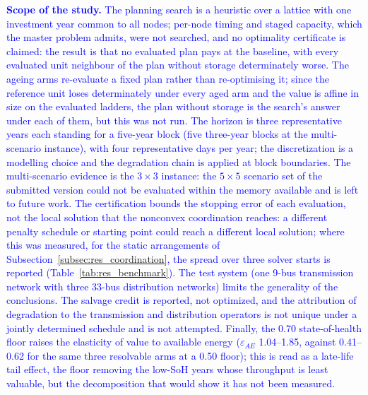 \documentclass[preprint,12pt]{elsarticle}
\begin{document}
\textcolor{blue}{
    \textbf{Scope of the study.} The planning search is a heuristic over a lattice with one investment year common to all nodes; per-node timing and staged capacity, which the master problem admits, were not searched, and no optimality certificate is claimed: the result is that no evaluated plan pays at the baseline, with every evaluated unit neighbour of the plan without storage determinately worse. The ageing arms re-evaluate a fixed plan rather than re-optimising it; since the reference unit loses determinately under every aged arm and the value is affine in size on the evaluated ladders, the plan without storage is the search's answer under each of them, but this was not run. The horizon is three representative years each standing for a five-year block (five three-year blocks at the multi-scenario instance), with four representative days per year; the discretization is a modelling choice and the degradation chain is applied at block boundaries. 
    The multi-scenario evidence is the $3 \times 3$ instance: the $5 \times 5$ scenario set of the submitted version could not be evaluated within the memory available and is left to future work. The certification bounds the stopping error of each evaluation, not the local solution that the nonconvex coordination reaches: a different penalty schedule or starting point could reach a different local solution; where this was measured, for the static arrangements of Subsection~\ref{subsec:res_coordination}, the spread over three solver starts is reported (Table~\ref{tab:res_benchmark}).
    The test system (one 9-bus transmission network with three 33-bus distribution networks) limits the generality of the conclusions. The salvage credit is reported, not optimized, and the attribution of degradation to the transmission and distribution operators is not unique under a jointly determined schedule and is not attempted. Finally, the 0.70 state-of-health floor raises the elasticity of value to available energy ($\varepsilon_{AE}$ 1.04--1.85, against 0.41--0.62 for the same three resolvable arms at a 0.50 floor); this is read as a late-life tail effect, the floor removing the low-SoH years whose throughput is least valuable, but the decomposition that would show it has not been measured.
}

\end{document}
